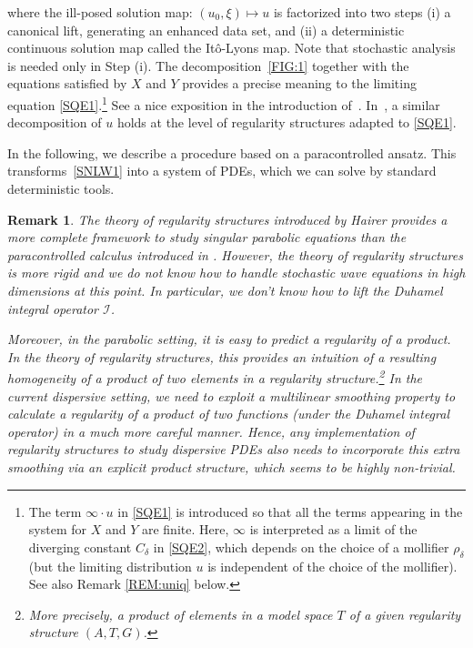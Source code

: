 \documentclass[%
11pt,  reqno]{amsart}
\newtheorem{remark}[theorem]{Remark}
\newcommand{\1}{\hspace{0.2mm}\text{I}\hspace{0.2mm}}
\newcommand{\noi}{\noindent}
\newcommand{\dl}{\delta}
\newcommand{\I}{\mathcal{I}}
\numberwithin{equation}{section}
\numberwithin{theorem}{section}
\begin{document}
\noi
where  the ill-posed solution map:
$(u_0, \xi)\mapsto u$
is factorized into two steps (i) a canonical lift, generating an enhanced data set, 
and (ii) a deterministic continuous solution map called the It\^o-Lyons map.
Note that stochastic analysis is needed only in Step (i).
%
%
%
% 
%
The decomposition~\eqref{FIG:1} together with the equations
satisfied by $X$ and $Y$ 
provides a precise meaning to 
the limiting equation \eqref{SQE1}.\footnote{The term $\infty\cdot u$
in \eqref{SQE1}  is introduced so that all the terms
appearing in the system for $X$ and $Y$ are finite.
Here, $\infty$ is interpreted as a limit of the diverging constant $C_\dl$
in \eqref{SQE2}, which depends on the choice of a mollifier $\rho_\dl$
(but the limiting distribution $u$ is independent of the choice of the mollifier).
See also Remark \ref{REM:uniq} below.
}
See a nice exposition in the introduction of~\cite{MW1}.
In~\cite{Hairer}, a similar decomposition of $u$ holds at the level of regularity structures
adapted to \eqref{SQE1}.


\medskip

In the following, we describe a procedure based on a paracontrolled ansatz.
This  transforms~\eqref{SNLW1}
into a system of PDEs, 
which we can solve by standard deterministic tools.


\begin{remark}\rm
The theory of regularity structures introduced by Hairer \cite{Hairer}
provides a more complete framework
to study singular parabolic equations than the paracontrolled calculus
introduced in \cite{GIP}.
However, 
the theory of regularity structures
 is more rigid and we do not know how to handle
 stochastic wave equations in high dimensions at this point.
 In particular, 
 we don't know how to lift the Duhamel integral operator $\I$.

Moreover, in the parabolic setting, it is easy to predict a regularity of a product.
In the theory of regularity structures, 
this  provides an intuition of a resulting homogeneity 
of a product of two elements in a regularity structure.\footnote{More precisely, 
a product of elements in a model space $T$ of a given regularity structure $(A, T, G)$.}
In the current dispersive setting, 
we need to exploit a multilinear smoothing property
to calculate a regularity of a product
of two functions (under the Duhamel integral operator)
in a much more careful manner.
Hence, any implementation of regularity structures
to study dispersive PDEs also needs to incorporate
this extra smoothing via an explicit product structure, 
which seems to be highly non-trivial.
\end{remark}
\end{document}
